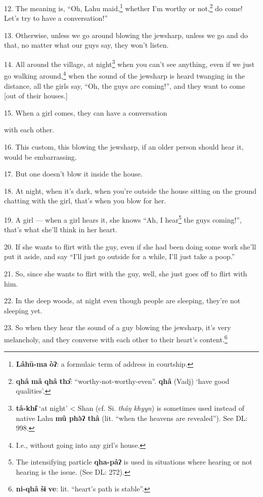 12. The meaning is, ``Oh, Lahu maid,\footnote{\textbf{Lâhū-ma} \textbf{òʔ}: a formulaic term of address in courtship.} whether I'm worthy or not,\footnote{\textbf{qhâ} \textbf{mâ} \textbf{qhâ} \textbf{thɔ̂}: ``worthy-not-worthy-even''. \textbf{qhâ} (Vadj) `have good qualities'.} do come!
Let's try to have a conversation!''

13. Otherwise, unless we go around blowing the jewsharp, unless we go and do that,
no matter what our guys say, they won't listen.

14. All around the village, at night\footnote{\textbf{tâ-khɨ̂} `at night' < Shan (cf. Si. \textit{tháŋ khyyn}) is sometimes used instead of native Lahu \textbf{mû phə̀ʔ thâ} (lit. ``when the heavens are revealed''). See DL: 998.} when you can't see anything, even if we
just go walking around,\footnote{I.e., without going into any girl's house.} when the sound of the jewsharp is heard twanging in
the distance, all the girls say, ``Oh, the guys are coming!'', and they want to
come [out of their houses.]

15. When a girl comes, they can have a conversation

with each other.

16. This custom, this blowing the jewsharp, if an older person should hear it,
would be embarrassing.

17. But one doesn't blow it inside the house.

18. At night, when it's dark, when you're outside the house sitting on the ground
chatting with the girl, that's when you blow for her.

19. A girl --- when a girl hears it, she knows ``Ah, I hear\footnote{The intensifying particle \textbf{qha-pâʔ} is used in situations where hearing or not hearing is the issue. (See DL: 272).} the guys coming!'',
that's what she'll think in her heart.

20. If she wants to flirt with the guy, even if she had been doing some work she'll
put it aside, and say ``I'll just go outside for a while, I'll just take a poop.''

21. So, since she wants to flirt with the guy, well, she just goes off to flirt
with him.

22. In the deep woods, at night even though people are sleeping, they're not sleeping
yet.

23. So when they hear the sound of a guy blowing the jewsharp, it's very melancholy,
and they converse with each other to their heart's content.\footnote{\textbf{ni-qhâ} \textbf{šɨ} \textbf{ve}: lit. ``heart's path is stable''.}

